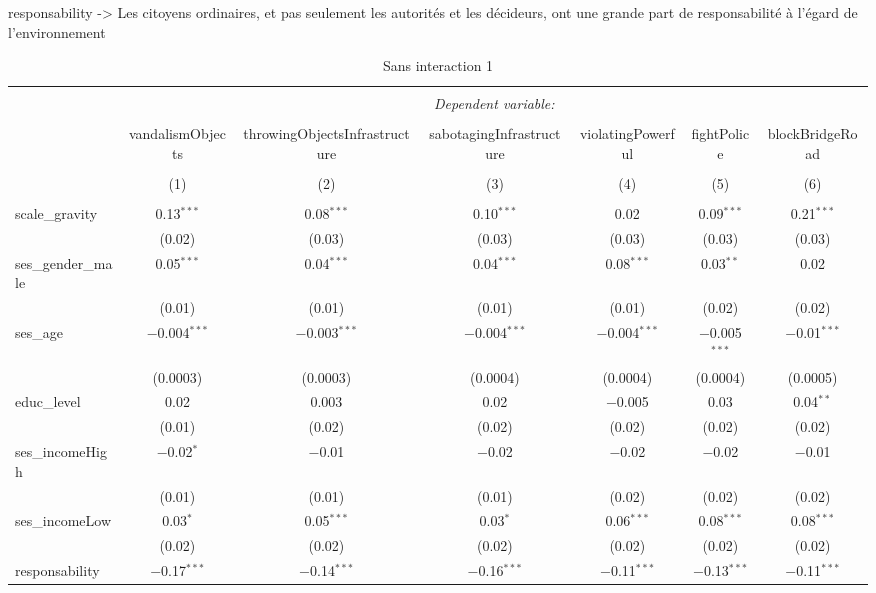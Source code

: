 \documentclass[
]{article}
\author{}
\date{\vspace{-2.5em}}
\begin{document}
responsability -\textgreater{} Les citoyens ordinaires, et pas seulement
les autorités et les décideurs, ont une grande part de responsabilité à
l'égard de l'environnement

\begin{sidewaystable}[!htbp] \centering 
  \caption{Sans interaction 1} 
  \label{} 
\begin{tabular}{@{\extracolsep{1pt}}lcccccc} 
\\[-1.8ex]\hline 
\hline \\[-1.8ex] 
 & \multicolumn{6}{c}{\textit{Dependent variable:}} \\ 
\cline{2-7} 
\\[-1.8ex] & vandalismObjects & throwingObjectsInfrastructure & sabotagingInfrastructure & violatingPowerful & fightPolice & blockBridgeRoad \\ 
\\[-1.8ex] & (1) & (2) & (3) & (4) & (5) & (6)\\ 
\hline \\[-1.8ex] 
 scale\_gravity & 0.13$^{***}$ & 0.08$^{***}$ & 0.10$^{***}$ & 0.02 & 0.09$^{***}$ & 0.21$^{***}$ \\ 
  & (0.02) & (0.03) & (0.03) & (0.03) & (0.03) & (0.03) \\ 
  ses\_gender\_male & 0.05$^{***}$ & 0.04$^{***}$ & 0.04$^{***}$ & 0.08$^{***}$ & 0.03$^{**}$ & 0.02 \\ 
  & (0.01) & (0.01) & (0.01) & (0.01) & (0.02) & (0.02) \\ 
  ses\_age & $-$0.004$^{***}$ & $-$0.003$^{***}$ & $-$0.004$^{***}$ & $-$0.004$^{***}$ & $-$0.005$^{***}$ & $-$0.01$^{***}$ \\ 
  & (0.0003) & (0.0003) & (0.0004) & (0.0004) & (0.0004) & (0.0005) \\ 
  educ\_level & 0.02 & 0.003 & 0.02 & $-$0.005 & 0.03 & 0.04$^{**}$ \\ 
  & (0.01) & (0.02) & (0.02) & (0.02) & (0.02) & (0.02) \\ 
  ses\_incomeHigh & $-$0.02$^{*}$ & $-$0.01 & $-$0.02 & $-$0.02 & $-$0.02 & $-$0.01 \\ 
  & (0.01) & (0.01) & (0.01) & (0.02) & (0.02) & (0.02) \\ 
  ses\_incomeLow & 0.03$^{*}$ & 0.05$^{***}$ & 0.03$^{*}$ & 0.06$^{***}$ & 0.08$^{***}$ & 0.08$^{***}$ \\ 
  & (0.02) & (0.02) & (0.02) & (0.02) & (0.02) & (0.02) \\ 
  responsability & $-$0.17$^{***}$ & $-$0.14$^{***}$ & $-$0.16$^{***}$ & $-$0.11$^{***}$ & $-$0.13$^{***}$ & $-$0.11$^{***}$ \\ 

\end{tabular}
\end{sidewaystable}
\end{document}
